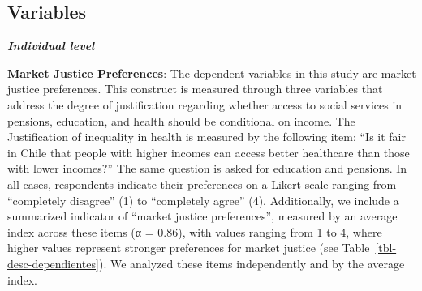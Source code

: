 \documentclass[
  12pt,
  letterpaper,
]{article}
\begin{document}
\subsection{Variables}\label{variables}

\textbf{\emph{Individual level}}

\textbf{Market Justice Preferences}: The dependent variables in this
study are market justice preferences. This construct is measured through
three variables that address the degree of justification regarding
whether access to social services in pensions, education, and health
should be conditional on income. The Justification of inequality in
health is measured by the following item: ``Is it fair in Chile that
people with higher incomes can access better healthcare than those with
lower incomes?'' The same question is asked for education and pensions.
In all cases, respondents indicate their preferences on a Likert scale
ranging from ``completely disagree'' (1) to ``completely agree'' (4).
Additionally, we include a summarized indicator of ``market justice
preferences'', measured by an average index across these items (α =
0.86), with values ranging from 1 to 4, where higher values represent
stronger preferences for market justice (see
Table~\ref{tbl-desc-dependientes}). We analyzed these items
independently and by the average index.
\end{document}
